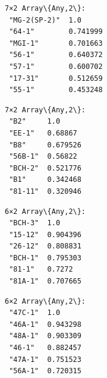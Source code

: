 \documentclass[11pt]{article}
\begin{document}
    
    
    \begin{Verbatim}[commandchars=\\\{\}]
7×2 Array\{Any,2\}:
 "MG-2(SP-2)"  1.0
 "64-1"        0.741999
 "MGI-1"       0.701663
 "56-1"        0.640372
 "57-1"        0.600702
 "17-31"       0.512659
 "55-1"        0.453248
    \end{Verbatim}

    
    
    \begin{Verbatim}[commandchars=\\\{\}]
7×2 Array\{Any,2\}:
 "B2"     1.0
 "EE-1"   0.68867
 "B8"     0.679526
 "56B-1"  0.56822
 "BCH-2"  0.521776
 "B1"     0.342468
 "81-11"  0.320946
    \end{Verbatim}

    
    
    \begin{Verbatim}[commandchars=\\\{\}]
6×2 Array\{Any,2\}:
 "BCH-3"  1.0
 "15-12"  0.904396
 "26-12"  0.808831
 "BCH-1"  0.795303
 "81-1"   0.7272
 "81A-1"  0.707665
    \end{Verbatim}

    
    
    \begin{Verbatim}[commandchars=\\\{\}]
6×2 Array\{Any,2\}:
 "47C-1"  1.0
 "46A-1"  0.943298
 "48A-1"  0.903309
 "46-1"   0.882457
 "47A-1"  0.751523
 "56A-1"  0.720315
    \end{Verbatim}

    
    \begin{center}
    \end{center}
    { \hspace*{\fill} \\}
    
\end{document}
